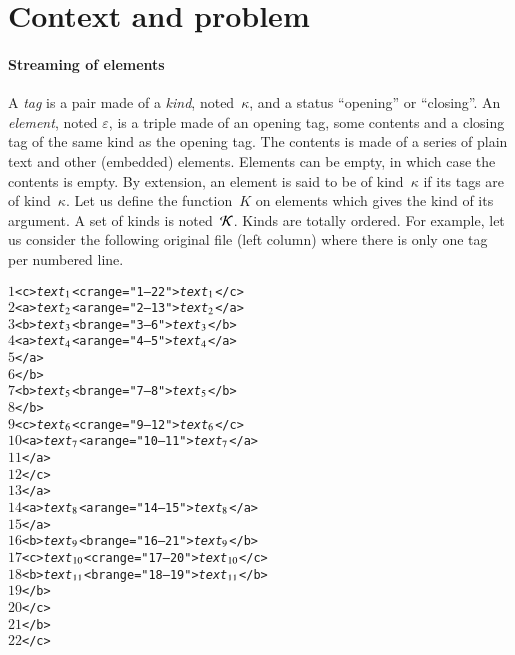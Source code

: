 
\section{Context and problem}
\label{problem} 

\paragraph{Streaming of \XML elements} 

A \emph{tag} is a pair made of a \emph{kind}, noted~\(\kappa\), and a
status ``opening'' or ``closing''. An \emph{element}, noted
\(\varepsilon\), is a triple made of an opening tag, some contents and
a closing tag of the same kind as the opening tag. The contents is
made of a series of plain text and other (embedded) elements. Elements
can be empty, in which case the contents is empty. By extension, an
element is said to be of kind~\(\kappa\) if its tags are of
kind~\(\kappa\). Let us define the function~\(K\) on elements which
gives the kind of its argument. A set of kinds is noted~\(\cal
K\). Kinds are totally ordered. For example, let us consider the
following original \XML file (left column) where there is only one tag
per numbered line.
{\small\begin{alltt}
 \(1\) <c> \emph{text\(\sb{1}\)}                          <c range="1--22"> \emph{text\(\sb{1}\)} </c>
 \(2\)   <a> \emph{text\(\sb{2}\)}                        <a range="2--13"> \emph{text\(\sb{2}\)} </a>
 \(3\)     <b> \emph{text\(\sb{3}\)}                      <b range="3--6"> \emph{text\(\sb{3}\)} </b>
 \(4\)       <a> \emph{text\(\sb{4}\)}                    <a range="4--5"> \emph{text\(\sb{4}\)} </a>
 \(5\)       </a>              
 \(6\)     </b>
 \(7\)     <b> \emph{text\(\sb{5}\)}                      <b range="7--8"> \emph{text\(\sb{5}\)} </b>
 \(8\)     </b>
 \(9\)     <c> \emph{text\(\sb{6}\)}                      <c range="9--12"> \emph{text\(\sb{6}\)} </c>
\(10\)       <a> \emph{text\(\sb{7}\)}                    <a range="10--11"> \emph{text\(\sb{7}\)} </a>
\(11\)       </a>
\(12\)     </c>
\(13\)   </a>
\(14\)   <a> \emph{text\(\sb{8}\)}                        <a range="14--15"> \emph{text\(\sb{8}\)} </a>
\(15\)   </a>
\(16\)   <b> \emph{text\(\sb{9}\)}                        <b range="16--21"> \emph{text\(\sb{9}\)} </b>
\(17\)     <c> \emph{text\(\sb{10}\)}                     <c range="17--20"> \emph{text\(\sb{10}\)} </c>
\(18\)       <b> \emph{text\(\sb{11}\)}                   <b range="18--19"> \emph{text\(\sb{11}\)} </b>
\(19\)       </b>
\(20\)     </c>
\(21\)   </b>
\(22\) </c>
\end{alltt}}

